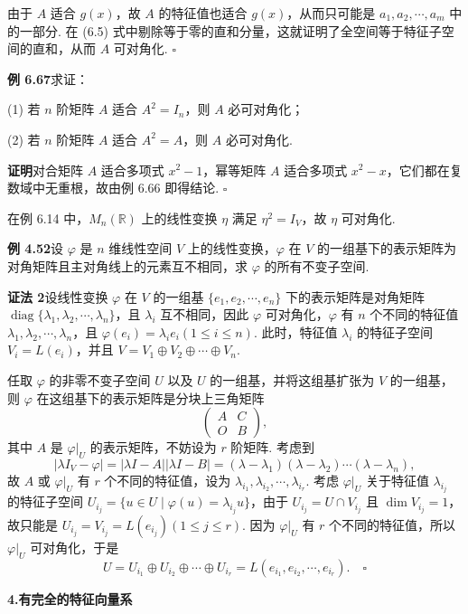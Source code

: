 \documentclass[UTF8, 12pt, fontset=fandol, oneside]{ctexart}
\begin{document}
由于 $A$ 适合 $g(x)$，故 $A$ 的特征值也适合 $g(x)$，从而只可能是 $a_1,a_2,\cdots,a_m$ 中的一部分. 在 (6.5) 式中剔除等于零的直和分量，这就证明了全空间等于特征子空间的直和，从而 $A$ 可对角化. $\square$

\noindent\textbf{例 6.67}\quad 求证：

(1) 若 $n$ 阶矩阵 $A$ 适合 $A^2=I_n$，则 $A$ 必可对角化；

(2) 若 $n$ 阶矩阵 $A$ 适合 $A^2=A$，则 $A$ 必可对角化.

\noindent\textbf{证明}\quad 对合矩阵 $A$ 适合多项式 $x^2-1$，幂等矩阵 $A$ 适合多项式 $x^2-x$，它们都在复数域中无重根，故由例 6.66 即得结论. $\square$

在例 6.14 中，$M_n(\mathbb{R})$ 上的线性变换 $\eta$ 满足 $\eta^2=I_V$，故 $\eta$ 可对角化.

\noindent\textbf{例 4.52}\quad 设 $\varphi$ 是 $n$ 维线性空间 $V$ 上的线性变换，$\varphi$ 在 $V$ 的一组基下的表示矩阵为对角矩阵且主对角线上的元素互不相同，求 $\varphi$ 的所有不变子空间.

\noindent\textbf{证法 2}\quad 设线性变换 $\varphi$ 在 $V$ 的一组基 $\{e_1,e_2,\cdots,e_n\}$ 下的表示矩阵是对角矩阵 $\operatorname{diag}\{\lambda_1,\lambda_2,\cdots,\lambda_n\}$，且 $\lambda_i$ 互不相同，因此 $\varphi$ 可对角化，$\varphi$ 有 $n$ 个不同的特征值 $\lambda_1,\lambda_2,\cdots,\lambda_n$，且 $\varphi(e_i)=\lambda_ie_i(1\le i\le n)$. 此时，特征值 $\lambda_i$ 的特征子空间 $V_i=L(e_i)$，并且 $V=V_1\oplus V_2\oplus\cdots\oplus V_n$.

任取 $\varphi$ 的非零不变子空间 $U$ 以及 $U$ 的一组基，并将这组基扩张为 $V$ 的一组基，则 $\varphi$ 在这组基下的表示矩阵是分块上三角矩阵
\[
\left(\begin{array}{cc}
A & C\\
O & B
\end{array}\right),
\]
其中 $A$ 是 $\varphi|_U$ 的表示矩阵，不妨设为 $r$ 阶矩阵. 考虑到
\[
|\lambda I_V-\varphi|=|\lambda I-A||\lambda I-B|=(\lambda-\lambda_1)(\lambda-\lambda_2)\cdots(\lambda-\lambda_n),
\]
故 $A$ 或 $\varphi|_U$ 有 $r$ 个不同的特征值，设为 $\lambda_{i_1},\lambda_{i_2},\cdots,\lambda_{i_r}$. 考虑 $\varphi|_U$ 关于特征值 $\lambda_{i_j}$ 的特征子空间 $U_{i_j}=\{u\in U\mid \varphi(u)=\lambda_{i_j}u\}$，由于 $U_{i_j}=U\cap V_{i_j}$ 且 $\dim V_{i_j}=1$，故只能是 $U_{i_j}=V_{i_j}=L(e_{i_j})(1\le j\le r)$. 因为 $\varphi|_U$ 有 $r$ 个不同的特征值，所以 $\varphi|_U$ 可对角化，于是
\[
U=U_{i_1}\oplus U_{i_2}\oplus\cdots\oplus U_{i_r}=L(e_{i_1},e_{i_2},\cdots,e_{i_r}). \quad \square
\]

\noindent\textbf{4.\quad 有完全的特征向量系}
\end{document}
